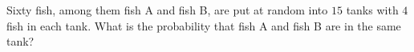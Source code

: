 Sixty fish, among them fish A and fish B, are put at random into $15$ tanks with $4$ fish in each tank. What is the probability that fish A and fish B are in the same tank?
